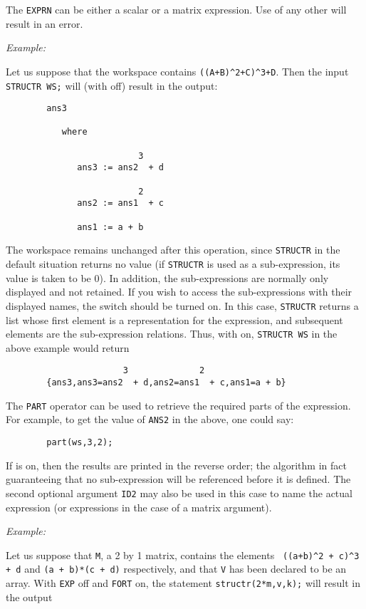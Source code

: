 The \texttt{EXPRN} can be either a scalar or a matrix expression.  Use of any
other will result in an error.

\textit{Example:}

Let us suppose that the workspace contains
\texttt{((A+B)\textasciicircum2+C)\textasciicircum3+D}.
Then the input \texttt{STRUCTR WS;} will (with  off) result in the
output:
\begin{verbatim}
        ans3

           where

                          3
              ans3 := ans2  + d

                          2
              ans2 := ans1  + c

              ans1 := a + b
\end{verbatim}
\hypertarget{switch:SAVESTRUCTR}{}
The workspace remains unchanged after this operation, since \texttt{STRUCTR}
 in the default situation returns
no value (if \texttt{STRUCTR} is used as a sub-expression, its value is taken
to be 0).  In addition, the sub-expressions are normally only displayed
and not retained. If you wish to access the sub-expressions with their
displayed names, the switch  should be
turned on.  In this case, \texttt{STRUCTR} returns a list whose first element
is a representation for the expression, and subsequent elements are the
sub-expression relations.  Thus, with  on, \texttt{STRUCTR WS}
in the above example would return
\begin{verbatim}
                       3              2
        {ans3,ans3=ans2  + d,ans2=ans1  + c,ans1=a + b}
\end{verbatim}
The \texttt{PART} operator can
be used to retrieve the required parts of the expression.  For example, to
get the value of \texttt{ANS2} in the above, one could say:
\begin{verbatim}
        part(ws,3,2);
\end{verbatim}
If  is on, then the results are printed in the reverse order; the
algorithm in fact guaranteeing that no sub-expression will be referenced
before it is defined.  The second optional argument \texttt{ID2} may also be
used in this case to name the actual expression (or expressions in the
case of a matrix argument).

\textit{Example:}

Let us suppose that \texttt{M}, a 2 by 1 matrix, contains the elements {\tt
((a+b)\verb|^|2 + c)\verb|^|3 + d} and \texttt{(a + b)*(c + d)} respectively,
and that \texttt{V} has been declared to be an array.  With \texttt{EXP} off and
\texttt{FORT} on, the statement \texttt{structr(2*m,v,k);} will result in the output

